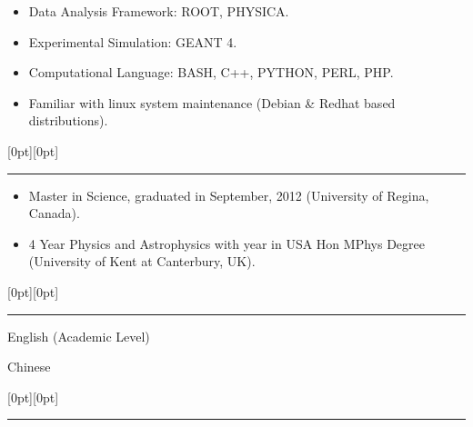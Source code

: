 \documentclass[letterpaper,12pt]{letter}
\begin{document}
\begin{itemize}
\item \textrm{\normalsize Data Analysis Framework: ROOT, PHYSICA.}
\item \textrm{\normalsize Experimental Simulation: GEANT 4.}
\item \textrm{\normalsize Computational Language: BASH, C++, PYTHON, PERL, PHP.}
\item \textrm{\normalsize Familiar with linux system maintenance (Debian \& Redhat based distributions).}
\end{itemize}

\secb



\raisebox{0pt}[0pt][0pt]{\Large\textbf{\raisebox{-3.5ex}{Qualification}}} 
\\[2mm]
\rule[-0.5cm]{10cm}{1pt}
\begin{itemize}
\item \textrm{\normalsize Master in Science, graduated in September, 2012 (University of Regina, Canada).}
\item \textrm{\normalsize 4 Year Physics and Astrophysics with year in USA Hon MPhys Degree (University of Kent at Canterbury, UK).}
\end{itemize}

\secb



\raisebox{0pt}[0pt][0pt]{\Large\textbf{\raisebox{-3.5ex}{Language Skill}}} 
\\[2mm]
\rule[-0.5cm]{10cm}{1pt}

% 

\begin{shortitemize}
\item \textrm{\normalsize English (Academic Level)}
\item \textrm{\normalsize Chinese}
\end{shortitemize}
\secb



\raisebox{0pt}[0pt][0pt]{\Large\textbf{\raisebox{-3.5ex}{Additional Information}}} 
\\[2mm]
\rule[-0.5cm]{10cm}{1pt}
\end{document}
